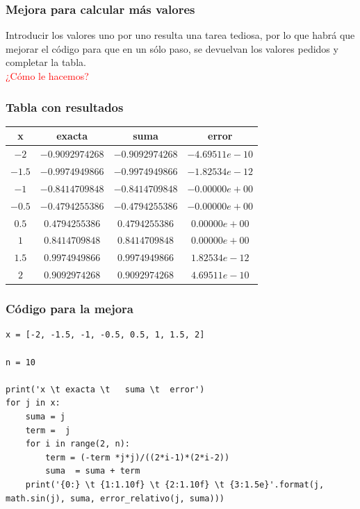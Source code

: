 \begin{frame}
\frametitle{Mejora para calcular más valores}
Introducir los valores uno por uno resulta una tarea tediosa, por lo que habrá que mejorar el código para que en un sólo paso, se devuelvan los valores pedidos y completar la tabla.
\\
\bigskip
\textcolor{red}{¿Cómo le hacemos?}
\end{frame}
\begin{frame}[fragile]
\frametitle{Tabla con resultados}
\begin{table}
\fontsize{12}{12}\selectfont
\begin{tabular}{c c c c}
x & exacta & suma & error \\ \hline
$-2$  & $-0.9092974268$ &  $-0.9092974268$ &  $-4.69511e-10$ \\ \hline
$-1.5$ & $-0.9974949866$ &  $-0.9974949866$ &  $-1.82534e-12$ \\ \hline
$-1$ & $-0.8414709848$ &  $-0.8414709848$ &  $-0.00000e+00$ \\ \hline
$-0.5$ & $-0.4794255386$ &  $-0.4794255386$ &  $-0.00000e+00$ \\ \hline
$0.5$ & $0.4794255386 $ &  $0.4794255386$ &  $0.00000e+00$ \\ \hline
$1$ & $0.8414709848$ &  $0.8414709848$ &  $0.00000e+00$ \\ \hline
$1.5$ & $0.9974949866$ &  $0.9974949866$ &  $1.82534e-12$ \\ \hline
$2$ & $0.9092974268$ &  $0.9092974268$ &  $4.69511e-10$ \\ \hline
\end{tabular}
\end{table}
\end{frame}
\begin{frame}
\frametitle{Código para la mejora}
\begin{lstlisting}[style=codigopython]
x = [-2, -1.5, -1, -0.5, 0.5, 1, 1.5, 2]

n = 10

print('x \t exacta \t   suma \t  error')
for j in x:
    suma = j
    term =  j
    for i in range(2, n):
        term = (-term *j*j)/((2*i-1)*(2*i-2))
        suma  = suma + term
    print('{0:} \t {1:1.10f} \t {2:1.10f} \t {3:1.5e}'.format(j, math.sin(j), suma, error_relativo(j, suma)))
\end{lstlisting}
\end{frame}
